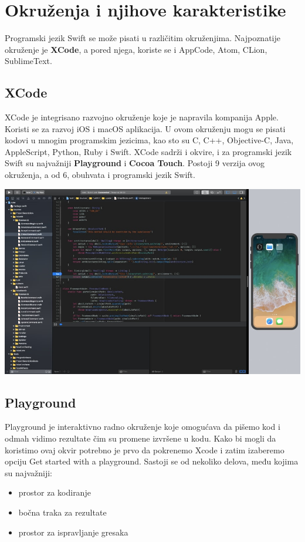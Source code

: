 \documentclass[a4paper]{article}
\begin{document}
\section{Okruženja i njihove karakteristike}	
\label{sec:cetvrtiDeo}

Programski jezik Swift se može pisati u različitim okruženjima. Najpoznatije okruženje je \textbf{XCode}, a pored njega, koriste se i AppCode, Atom, CLion, SublimeText.

\subsection{XCode}
\label{subsec:podnaslovXCode}



XCode je integrisano razvojno okruženje koje je napravila kompanija Apple. Koristi se za razvoj iOS i macOS aplikacija. U ovom okruženju mogu se pisati kodovi u mnogim programskim jezicima, kao sto su C, C++, Objective-C, Java, AppleScript, Python, Ruby i Swift. XCode sadrži i okvire, i za programski jezik Swift su najvažniji \textbf{Playground} i \textbf{Cocoa Touch}. 
Postoji 9 verzija ovog okruženja, a od 6, obuhvata i programski jezik Swift.
\vspace{3mm}


\includegraphics[scale=0.2]{xcode.jpg}


\subsection{Playground}
\label{subsec:podnaslovPlayground}
\vspace{3mm}


Playground je interaktivno radno okruženje koje omogućava da pišemo kod i odmah vidimo
rezultate čim su promene izvršene u kodu. Kako bi mogli da koristimo ovaj okvir potrebno je prvo
da pokrenemo Xcode i zatim izaberemo opciju Get started with a playground.
Sastoji se od nekoliko delova, među kojima su najvažniji: 
\begin{itemize}
\item prostor za kodiranje
\item bočna traka za rezultate
\item prostor za ispravljanje gresaka
\end{itemize}
\vspace{3mm}
\end{document}
